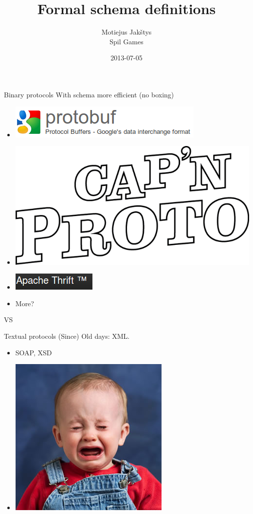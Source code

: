 \documentclass[14pt]{beamer}
\title{Formal schema definitions}
\author{Motiejus Jak\v{s}tys \\
Spil Games}
\date{2013-07-05}
\begin{document}
\begin{frame}[plain]
    \titlepage
\end{frame}

\begin{frame}{Binary protocols}
    With schema more efficient (no boxing)
    \begin{itemize}
        \item \includegraphics[height=0.1\textheight]{gpb.png}
        \item \includegraphics[height=0.2\textheight]{captain_proto.png}
        \item \includegraphics[height=0.05\textheight]{thrift.png}
        \item More?
    \end{itemize}
\end{frame}

\begin{frame}
    VS
\end{frame}

\begin{frame}{Textual protocols}
    (Since) Old days: XML.
    \pause
    \begin{itemize}
        \item SOAP, XSD
            \pause
        \item \includegraphics[height=0.5\textheight]{cry.jpg}
    \end{itemize}
\end{frame}
\end{document}
